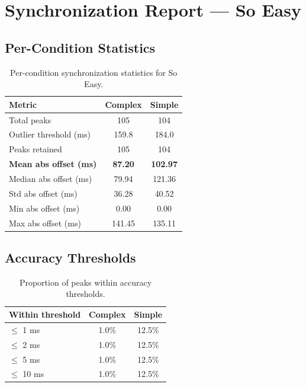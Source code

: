 
\section*{Synchronization Report --- So Easy}

\subsection*{Per-Condition Statistics}

\begin{table}[h!]
\centering
\begin{tabular}{|l|c|c|}
\hline
Metric & Complex & Simple \\
\hline
Total peaks & 105 & 104 \\
Outlier threshold (ms) & 159.8 & 184.0 \\
Peaks retained & 105 & 104 \\
\textbf{Mean abs offset (ms)} & \textbf{87.20} & \textbf{102.97} \\
Median abs offset (ms) & 79.94 & 121.36 \\
Std abs offset (ms) & 36.28 & 40.52 \\
Min abs offset (ms) & 0.00 & 0.00 \\
Max abs offset (ms) & 141.45 & 135.11 \\
\hline
\end{tabular}
\caption{Per-condition synchronization statistics for So Easy.}
\label{tab:sync_stats}
\end{table}

\subsection*{Accuracy Thresholds}

\begin{table}[h!]
\centering
\begin{tabular}{|l|c|c|}
\hline
Within threshold & Complex & Simple \\
\hline
$\leq$ 1 ms & 1.0\% & 12.5\% \\
$\leq$ 2 ms & 1.0\% & 12.5\% \\
$\leq$ 5 ms & 1.0\% & 12.5\% \\
$\leq$ 10 ms & 1.0\% & 12.5\% \\
\hline
\end{tabular}
\caption{Proportion of peaks within accuracy thresholds.}
\label{tab:sync_accuracy}
\end{table}

